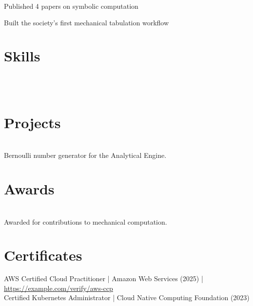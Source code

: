\documentclass[]{deedy-resume-openfont}
\begin{document}
          \begin{tightemize}
  \setlength\itemsep{2pt}
  \item Published 4 papers on symbolic computation
  \item Built the society's first mechanical tabulation workflow
\end{tightemize}
          \sectionsep
%
%
\vspace{3pt}
\section{Skills}
\raggedright
{} {} \\
 {} \\
\sectionsep
%
%
\vspace{3pt}
\section{Projects}
\raggedright

    \hfill {}\\
    Bernoulli number generator for the Analytical Engine.\\
    \sectionsep
      \vspace{3pt}
      \section{Awards}
        \\
Awarded for contributions to mechanical computation.\\
\sectionsep
%
%
\vspace{3pt}
\section{Certificates}
AWS Certified Cloud Practitioner | Amazon Web Services (2025) | \href{https://example.com/verify/aws-ccp}{https://example.com/verify/aws-ccp}\\
Certified Kubernetes Administrator | Cloud Native Computing Foundation (2023)\\
    \ 
    
\end{document}

